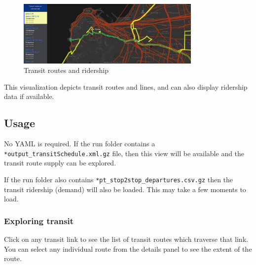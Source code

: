 \begin{figure}[H]
  \centering
  \includegraphics[width=0.8\textwidth]{assets/transit.jpg}
  \caption{Transit routes and ridership}
\end{figure}

This visualization depicts transit routes and lines, and can also display ridership data if available.

\hypertarget{usage}{%
\subsection{Usage}}

No YAML is required. If the run folder contains a
\texttt{*output\_transitSchedule.xml.gz} file, then this view will be
available and the transit route supply can be explored.

If the run folder also contains
\texttt{*pt\_stop2stop\_departures.csv.gz} then the transit ridership
(demand) will also be loaded. This may take a few moments to load.

\hypertarget{exploring-transit}{%
\subsubsection{Exploring transit}\label{exploring-transit}}

Click on any transit link to see the list of transit routes which
traverse that link. You can select any individual route from the details
panel to see the extent of the route.
